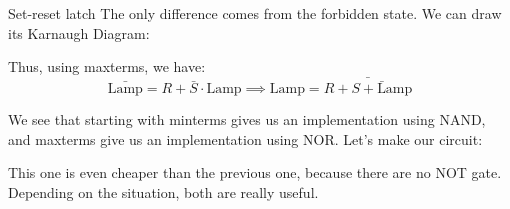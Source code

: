 \documentclass[a4paper]{article}
\begin{document}
\begin{parag}{Set-reset latch}
    The only difference comes from the forbidden state. We can draw its Karnaugh Diagram:

    Thus, using maxterms, we have: 
    \[\bar{\text{Lamp}} = R + \bar{S} \cdot \text{Lamp} \implies \text{Lamp} = \bar{R + \bar{S + \text{Lamp}}}\]
    
    We see that starting with minterms gives us an implementation using NAND, and maxterms give us an implementation using NOR. Let's make our circuit: 

    This one is even cheaper than the previous one, because there are no NOT gate. Depending on the situation, both are really useful.
\end{parag}
\end{document}
